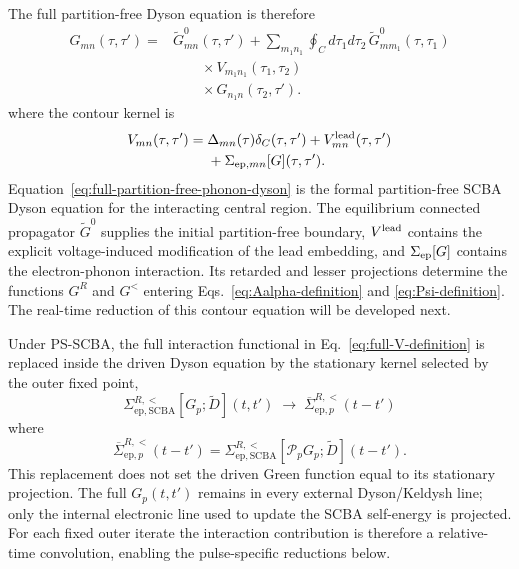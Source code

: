 \documentclass[
 reprint,
 superscriptaddress,
 amsmath,amssymb,
 aps,prb,
 longbibliography,
 floatfix
]{revtex4-2}
\newcommand{\ep}{\mathrm{ep}}
\newcommand{\barSigma}{\overline{\Sigma}}
\newcommand{\proj}{\mathcal P}
\begin{document}
The full partition-free Dyson equation is therefore
\begin{equation}
\begin{aligned}
G_{mn}(\tau,\tau')
={}&
\widetilde G_{mn}^{0}(\tau,\tau')
+
\sum_{m_1n_1}
\oint_C d\tau_1d\tau_2\,
\widetilde G_{m m_1}^{0}
(\tau,\tau_1)
\\
&\qquad\times
V_{m_1n_1}
(\tau_1,\tau_2)
\\
&\qquad\times
G_{n_1n}
(\tau_2,\tau').
\end{aligned}
\label{eq:full-partition-free-phonon-dyson}
\end{equation}
where the contour kernel is
\begin{equation}
\begin{aligned}
V_{mn}(\tau,\tau')
={}&
\Delta_{mn}(\tau)
\delta_C(\tau,\tau')
+
V_{mn}^{\rm lead}(\tau,\tau')
\\
&+
\Sigma_{{\rm ep},mn}[G]
(\tau,\tau').
\end{aligned}
\label{eq:full-V-definition}
\end{equation}
Equation~\eqref{eq:full-partition-free-phonon-dyson} is the formal
partition-free SCBA Dyson equation for the interacting central
region. The equilibrium connected propagator \(\widetilde G^0\) supplies the initial partition-free boundary, \(V^{\rm lead}\) contains the explicit voltage-induced modification of the lead embedding, and \(\Sigma_{\rm ep}[G]\) contains the electron-phonon interaction. Its retarded and lesser projections determine the functions \(G^R\) and \(G^<\) entering Eqs.~\eqref{eq:Aalpha-definition} and \eqref{eq:Psi-definition}. The real-time reduction of this contour equation will be developed next.

Under PS-SCBA, the full interaction functional in Eq.~\eqref{eq:full-V-definition} is replaced inside the driven Dyson equation by the stationary kernel selected by the outer fixed point,
\begin{equation*}
\Sigma_{\ep,\mathrm{SCBA}}^{R,<}
[G_p;\widetilde D](t,t')
\;\longrightarrow\;
\barSigma_{\ep,p}^{R,<}(t-t')
\end{equation*}
where
\begin{equation}
\barSigma_{\ep,p}^{R,<}(t-t')
=
\Sigma_{\ep,\mathrm{SCBA}}^{R,<}
[\proj_pG_p;\widetilde D](t-t').
\label{eq:pf-psscba-replacement}
\end{equation}
This replacement does not set the driven Green function equal to its stationary projection. The full \(G_p(t,t')\) remains in every external Dyson/Keldysh line; only the internal electronic line used to update the SCBA self-energy is projected. For each fixed outer iterate the interaction contribution is therefore a relative-time convolution, enabling the pulse-specific reductions below.
\end{document}
